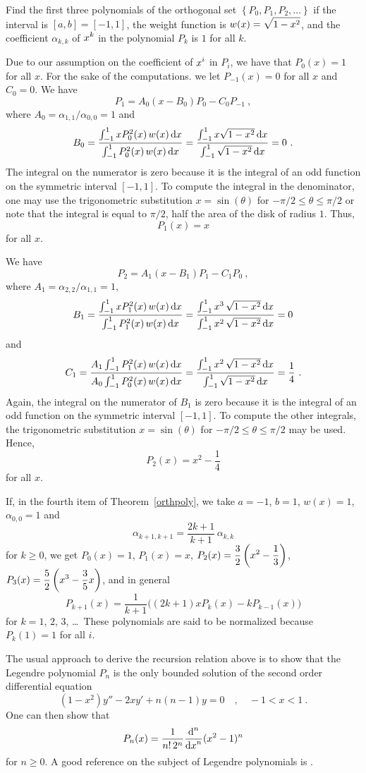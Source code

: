 \begin{egg}
Find the first three polynomials of the orthogonal set
$\left\{ P_0,P_1,P_2,\ldots \right\}$ if the interval is
$[a,b]=[-1,1]$, the weight function is $\DS w(x)=\sqrt{1-x^2}$,
and the coefficient $\alpha_{k,k}$ of $\DS x^k$ in the
polynomial $P_k$ is $1$ for all $k$.

Due to our assumption on the coefficient of $\DS x^i$ in
$P_i$, we have that $P_0(x) = 1$ for all $x$.  For the sake of the
computations. we let $P_{-1}(x)=0$ for all $x$ and $C_0=0$.
We have
\[
P_1 = A_0 (x-B_0)P_0 -C_0 P_{-1}\  ,
\]
where $A_0 = \alpha_{1,1}/\alpha_{0,0} = 1$ and
\[
B_0 = \frac{\int_{-1}^1 x P_0^2(x)\, w(x) \dx{x}}
{\int_{-1}^1 P_0^2(x)\, w(x) \dx{x}}
= \frac{\int_{-1}^1 x \sqrt{1-x^2} \dx{x}}
{\int_{-1}^1 \sqrt{1-x^2} \dx{x}} = 0 \  .
\]
The integral on the numerator is zero because it is the integral of an
odd function on the symmetric interval $[-1,1]$.  To compute the integral
in the denominator, one may use the trigonometric substitution
$x=\sin(\theta)$ for $-\pi/2 \leq \theta \leq \pi/2$ or note that the
integral is equal to $\pi/2$, half the area of the disk of radius $1$.  Thus,
\[
P_1(x) = x
\]
for all $x$.

We have
\[
P_2 = A_1 (x-B_1)P_1 -C_1 P_0 \  ,
\]
where $A_1 = \alpha_{2,2}/\alpha_{1,1} = 1$,
\[
B_1 = \frac{\int_{-1}^1 x P_1^2(x)\, w(x) \dx{x}}
{\int_{-1}^1 P_1^2(x)\, w(x)\dx{x}}
=  \frac{\int_{-1}^1 x^3\, \sqrt{1-x^2} \dx{x}}
{\int_{-1}^1 x^2\,\sqrt{1-x^2}\dx{x}}
= 0
\]
and
\[
C_1 = \frac{A_1 \int_{-1}^1 P_1^2(x)\, w(x) \dx{x}}
{A_0 \int_{-1}^1 P_0^2(x)\, w(x)\dx{x}}
= \frac{\int_{-1}^1 x^2\,\sqrt{1-x^2} \dx{x}}
{\int_{-1}^1 \sqrt{1-x^2}\dx{x}}
= \frac{1}{4} \  .
\]
Again, the integral on the numerator of $B_1$ is zero because it is
the integral of an odd function on the symmetric interval $[-1,1]$.
To compute the other integrals, the trigonometric
substitution $x=\sin(\theta)$ for $-\pi/2 \leq \theta \leq \pi/2$ may
be used.  Hence,
\[
P_2(x) = x^2  -\frac{1}{4}
\]
for all $x$.
\end{egg}

\begin{egg}
If, in the fourth item of Theorem~\ref{orthpoly}, we take $a=-1$,
$b=1$, $w(x) = 1$, $\alpha_{0,0} = 1$ and
\[
\alpha_{k+1,k+1} = \frac{2k+1}{k+1}\, \alpha_{k,k}
\]
for $k \geq 0$, we get $P_0(x) = 1$, $P_1(x) = x$,
$\DS P_2(x) = \frac{3}{2}\left(x^2- \frac{1}{3}\right)$,
$\DS P_3(x) = \frac{5}{2}\left(x^3 -\frac{3}{5} x\right)$,
and in general
\[
  P_{k+1}(x) = \frac{1}{k+1}\big( (2k+1)xP_k(x) -k P_{k-1}(x) \big)
\]
for $k=1$, $2$, $3$, \ldots\ These polynomials are said to be
normalized because $P_k(1) = 1$ for all $i$.

The usual approach to derive the recursion relation above is to show
that the Legendre polynomial $P_n$ is the only bounded solution of the
second order differential equation
\[
  (1-x^2) y'' - 2 xy' +n(n-1) y = 0 \quad , \quad -1 < x < 1 \ .
\]
One can then show that
\[
  P_n(x) = \frac{1}{n!\, 2^n} \dfdxn{(x^2-1)^n}{x}{n}
\]
for $n \geq 0$.  A good reference on the subject of Legendre
polynomials is \cite{GS}.
\end{egg}

